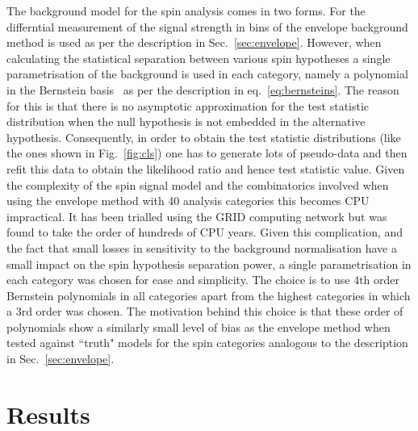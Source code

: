 The background model for the spin analysis comes in two forms. For the differntial measurement of the signal strength in bins of \abscostheta the envelope background method is used as per the description in Sec.~\ref{sec:envelope}. However, when calculating the statistical separation between various spin hypotheses a single parametrisation of the background is used in each category, namely a polynomial in the Bernstein basis~\cite{bernsteins1,bernsteins2} as per the description in eq.~\ref{eq:bernsteins}. The reason for this is that there is no asymptotic approximation for the test statistic distribution when the null hypothesis is not embedded in the alternative hypothesis. Consequently, in order to obtain the test statistic distributions (like the ones shown in Fig.~\ref{fig:cls}) one has to generate lots of pseudo-data and then refit this data to obtain the likelihood ratio and hence test statistic value. Given the complexity of the spin signal model and the combinatorics involved when using the envelope method with 40 analysis categories this becomes CPU impractical. It has been trialled using the GRID computing network but was found to take the order of hundreds of CPU years.
Given this complication, and the fact that small losses in sensitivity to the background normalisation have a small impact on the spin hypothesis separation power, a single parametrisation in each category was chosen for ease and simplicity. The choice is to use 4th order Bernstein polynomials in all categories apart from the highest \abscostheta categories in which a 3rd order was chosen. The motivation behind this choice is that these order of polynomials show a similarly small level of bias as the envelope method when tested against ``truth" models for the spin categories analogous to the description in Sec.~\ref{sec:envelope}.

\section{Results}
\label{sec:spin_results}


